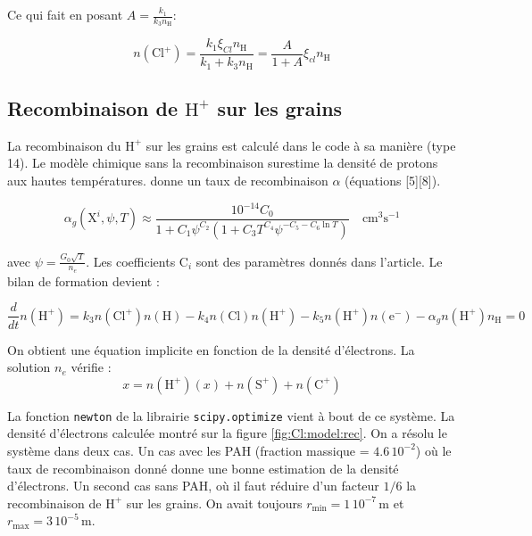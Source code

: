 Ce qui fait en posant $A = \frac{k_1}{k_3 n_{\mathrm{H}}}$:

\begin{equation}
\boxed{n(\mathrm{Cl}^+) = \frac{k_1 \xi_{Cl} n_{\mathrm{H}}}{k_1 + k_3 n_{\mathrm{H}}} = \frac{A}{1 + A} \xi_{cl} n_{\mathrm{H}}}
\end{equation}



\subsection{Recombinaison de $\mathrm{H}^+$ sur les grains}

La recombinaison du $\mathrm{H}^+$ sur les grains est calculé dans le code à sa manière (type 14). Le modèle chimique sans la recombinaison surestime la densité de protons aux hautes températures. \cite{Weingartner_2001} donne un taux de recombinaison $\alpha$ (équations [5][8]). 

\begin{equation}
    \alpha_{g}\left(\mathrm{X}^{i}, \psi, T\right) \approx \frac{10^{-14} C_{0} }{1+C_{1} \psi^{C_{2}}\left(1+C_{3} T^{C_{4}} \psi^{-C_{5}-C_{6} \ln T}\right)} \quad \mathrm{cm}^{3} \mathrm{s}^{-1}
\end{equation}

avec $\psi = \frac{G_0 \sqrt{T}}{n_e}$. Les coefficients $\mathrm{C}_i$ sont des paramètres donnés dans l'article. Le bilan de formation devient : 

\begin{equation}\label{eq:h+}
    \frac{d}{dt}n(\mathrm{H}^+) = k_3n(\mathrm{Cl}^+)n(\mathrm{H}) - k_4n(\mathrm{Cl})n(\mathrm{H}^+) - k_5 n(\mathrm{H}^+)n(\mathrm{e}^-) -\alpha_{g} n(\mathrm{H}^+)n_{\mathrm{H}} = 0
\end{equation}

On obtient une équation implicite en fonction de la densité d'électrons. La solution $n_e$ vérifie :
\begin{equation}
    x = n(\mathrm{H}^+)(x) + n(\mathrm{S}^+)  + n(\mathrm{C}^+)
\end{equation}

La fonction \texttt{newton} de la librairie \texttt{scipy.optimize} vient à bout de ce système. La densité d'électrons calculée montré sur la figure \ref{fig:Cl:model:rec}. On a résolu le système dans deux cas. Un cas avec les PAH (fraction massique = $4.6\,10^{-2}$) où le taux de recombinaison donné \cite{Weingartner_2001} donne une bonne estimation de la densité d'électrons. Un second cas sans PAH, où il faut réduire d'un facteur $1/6$ la recombinaison de $\mathrm{H}^+$ sur les grains. On avait toujours $r_{\mathrm{min}} = 1\,10^{-7}\,\mathrm{m}$ et $r_{\mathrm{max}} = 3\,10^{-5}\,\mathrm{m}$.

